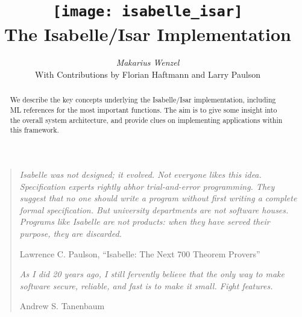 \documentclass[12pt,a4paper,fleqn]{report}
\title{\texttt{[image: isabelle\_isar]}
  \\[4ex] The Isabelle/Isar Implementation}
\author{\emph{Makarius Wenzel}  \\[3ex]
  With Contributions by
  Florian Haftmann
  and Larry Paulson
}
\begin{document}
\maketitle 

\begin{abstract}
  We describe the key concepts underlying the Isabelle/Isar
  implementation, including ML references for the most important
  functions.  The aim is to give some insight into the overall system
  architecture, and provide clues on implementing applications within
  this framework.
\end{abstract}

\vspace*{2.5cm}
\begin{quote}
  
  {\small\em Isabelle was not designed; it evolved.  Not everyone
    likes this idea.  Specification experts rightly abhor
    trial-and-error programming.  They suggest that no one should
    write a program without first writing a complete formal
    specification. But university departments are not software houses.
    Programs like Isabelle are not products: when they have served
    their purpose, they are discarded.}
  
  Lawrence C. Paulson, ``Isabelle: The Next 700 Theorem Provers''

  \vspace*{1cm}
  
  {\small\em As I did 20 years ago, I still fervently believe that the
    only way to make software secure, reliable, and fast is to make it
    small.  Fight features.}
  
  Andrew S. Tanenbaum

\end{quote}

\thispagestyle{empty}\clearpage

\tableofcontents
\listoffigures
\clearfirst









\appendix


\begingroup
\tocentry{\bibname}
 \small\raggedright\frenchspacing

\endgroup

\tocentry{\indexname}
\printindex
\end{document}
